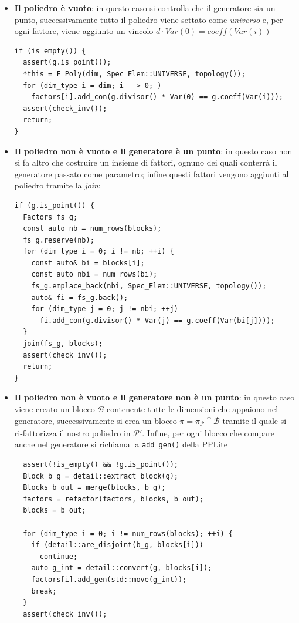 \documentclass[italian]{mimosis}
\theoremstyle{definition}
\begin{document}
\begin{itemize}
\item \textbf{Il poliedro è vuoto}: in questo caso si controlla che il generatore sia un
punto, successivamente tutto il poliedro viene settato come \emph{universo} e, per
ogni fattore, viene aggiunto un vincolo \(d \cdot \mathit{Var}(0) = \mathit{coeff}(\mathit{Var}(i))\)
\lstset{style=mystyle,language=C++,label= ,caption= ,captionpos=b,numbers=none}
\begin{lstlisting}
if (is_empty()) {
  assert(g.is_point());
  *this = F_Poly(dim, Spec_Elem::UNIVERSE, topology());
  for (dim_type i = dim; i-- > 0; )
    factors[i].add_con(g.divisor() * Var(0) == g.coeff(Var(i)));
  assert(check_inv());
  return;
}
\end{lstlisting}
\item \textbf{Il poliedro non è vuoto e il generatore è un punto}: in questo caso non si fa
altro che costruire un insieme di fattori, ognuno dei quali conterrà il
generatore passato come parametro; infine questi fattori vengono aggiunti al
poliedro tramite la \emph{join}:
\lstset{style=mystyle,language=C++,label= ,caption= ,captionpos=b,numbers=none}
\begin{lstlisting}
if (g.is_point()) {
  Factors fs_g;
  const auto nb = num_rows(blocks);
  fs_g.reserve(nb);
  for (dim_type i = 0; i != nb; ++i) {
    const auto& bi = blocks[i];
    const auto nbi = num_rows(bi);
    fs_g.emplace_back(nbi, Spec_Elem::UNIVERSE, topology());
    auto& fi = fs_g.back();
    for (dim_type j = 0; j != nbi; ++j)
      fi.add_con(g.divisor() * Var(j) == g.coeff(Var(bi[j])));
  }
  join(fs_g, blocks);
  assert(check_inv());
  return;
}
\end{lstlisting}
\item \textbf{Il poliedro non è vuoto e il generatore non è un punto}: in questo caso viene
creato un blocco \(\mathcal{B}\) contenente tutte le dimensioni che appaiono
nel generatore, successivamente si crea un blocco \(\pi =
  \pi_{\mathcal{P}} \uparrow \mathcal{B}\) tramite il quale si ri-fattorizza il
nostro poliedro in \(\mathcal{P}'\). Infine, per ogni blocco che compare anche
nel generatore si richiama la \texttt{add\_gen()} della PPLite
\lstset{style=mystyle,language=C++,label= ,caption= ,captionpos=b,numbers=none}
\begin{lstlisting}
  assert(!is_empty() && !g.is_point());
  Block b_g = detail::extract_block(g);
  Blocks b_out = merge(blocks, b_g);
  factors = refactor(factors, blocks, b_out);
  blocks = b_out;

  for (dim_type i = 0; i != num_rows(blocks); ++i) {
    if (detail::are_disjoint(b_g, blocks[i]))
      continue;
    auto g_int = detail::convert(g, blocks[i]);
    factors[i].add_gen(std::move(g_int));
    break;
  }
  assert(check_inv());
\end{lstlisting}
\end{itemize}
\end{document}
